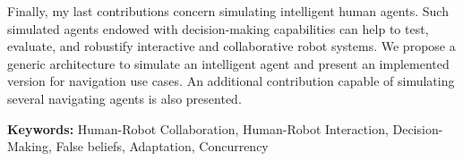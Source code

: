 Finally, my last contributions concern simulating intelligent human agents. Such simulated agents endowed with decision-making capabilities can help to test, evaluate, and robustify interactive and collaborative robot systems. We propose a generic architecture to simulate an intelligent agent and present an implemented version for navigation use cases. An additional contribution capable of simulating several navigating agents is also presented.  

\textbf{Keywords:} Human-Robot Collaboration, Human-Robot Interaction, Decision-Making, False beliefs, Adaptation, Concurrency